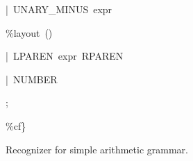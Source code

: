\documentclass[12pt,english,twoside]{report}
\newenvironment{codeblock}
{\begin{list}{}{
\setlength{\rightmargin}{\leftmargin}
\setlength{\listparindent}{0pt}%
\raggedright
\setlength{\itemsep}{0pt}
\setlength{\parsep}{0pt}
\normalfont\ttfamily}%
 \item[]}
{\end{list}}
\begin{document}
\begin{algorithm}
\begin{codeblock}
\begin{codeblock}
\begin{codeblock}
{\small |~UNARY\_MINUS~expr}{\small \par}
\begin{codeblock}
{\small \%layout~()}{\small \par}
\end{codeblock}
{\small |~LPAREN~expr~RPAREN}{\small \par}

{\small |~NUMBER}{\small \par}

{\small ;}{\small \par}
\end{codeblock}
\end{codeblock}
{\small \%cf\}}{\small \par}
\end{codeblock}

\caption{\label{alg:Arithmetic-recognizer}Recognizer for simple arithmetic
grammar.}
\end{algorithm}
\end{document}
